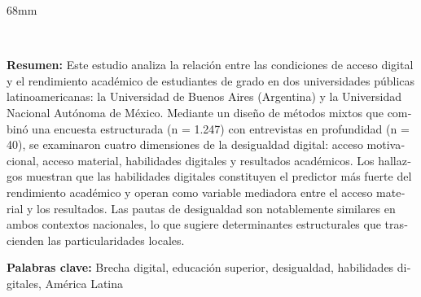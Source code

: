 \documentclass{article}
\begin{document}
\begin{textblock*}{68mm}
{\begin{minipage}[t]{68mm}
{\href{https://wa.me/?text=https%3A%2F%2Fwww.redalyc.org%2Fjournal%2F4136%2F413677448001%2Fhtml%2F}{}~
\href{https://twitter.com/intent/tweet?url=https%3A%2F%2Fwww.redalyc.org%2Fjournal%2F4136%2F413677448001%2Fhtml%2F&text=Desigualdad%20digital%20y%20rendimiento%20acad%C3%A9mico%20en%20la%20educaci%C3%B3n%20superior%3A%20un%20estudio%20comparativo%20en%20universidades%20p%C3%BAblicas%20de%20Argentina%20y%20M%C3%A9xico}{}
}\par
\end{minipage}%
}%
\end{textblock*}


\begin{tcolorbox}[colback=brown!8!white,colframe=brown!8!white,boxrule=0pt,arc=2pt,left=4pt,right=4pt,top=3pt,bottom=3pt,before skip=4pt,after skip=4pt]
\begin{otherlanguage}{spanish}
\sffamily\small \textbf{Resumen:} Este estudio analiza la relación entre las condiciones de acceso digital y el rendimiento académico de estudiantes de grado en dos universidades públicas latinoamericanas: la Universidad de Buenos Aires (Argentina) y la Universidad Nacional Autónoma de México. Mediante un diseño de métodos mixtos que combinó una encuesta estructurada (n = 1.247) con entrevistas en profundidad (n = 40), se examinaron cuatro dimensiones de la desigualdad digital: acceso motivacional, acceso material, habilidades digitales y resultados académicos. Los hallazgos muestran que las habilidades digitales constituyen el predictor más fuerte del rendimiento académico y operan como variable mediadora entre el acceso material y los resultados. Las pautas de desigualdad son notablemente similares en ambos contextos nacionales, lo que sugiere determinantes estructurales que trascienden las particularidades locales.
\par\smallskip\noindent\textbf{Palabras clave:} Brecha digital, educación superior, desigualdad, habilidades digitales, América Latina
\end{otherlanguage}
\end{tcolorbox}
\end{document}

